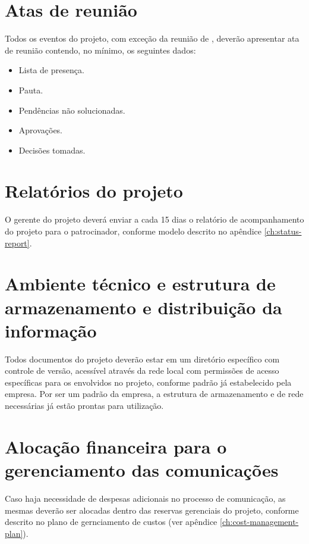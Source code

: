 \section{Atas de reunião}

Todos os eventos do projeto, com exceção da reunião de , deverão apresentar ata de reunião contendo, no mínimo, os seguintes dados:

\begin{itemize}
	\item Lista de presença.
	\item Pauta.
	\item Pendências não solucionadas.
	\item Aprovações.
	\item Decisões tomadas.
\end{itemize}


\section{Relatórios do projeto}

O gerente do projeto deverá enviar a cada 15 dias o relatório de acompanhamento do projeto para o patrocinador, conforme modelo descrito no apêndice \ref{ch:status-report}.

\section{Ambiente técnico e estrutura de armazenamento e distribuição da informação}

Todos documentos do projeto deverão estar em um diretório específico com controle de versão, acessível através da rede local com permissões de acesso específicas para os envolvidos no projeto, conforme padrão já estabelecido pela empresa. Por ser um padrão da empresa, a estrutura de armazenamento e de rede necessárias já estão prontas para utilização.

\section{Alocação financeira para o gerenciamento das comunicações}

Caso haja necessidade de despesas adicionais no processo de comunicação, as mesmas deverão ser alocadas dentro das reservas gerenciais do projeto, conforme descrito no plano de gernciamento de custos (ver apêndice \ref{ch:cost-management-plan}).

